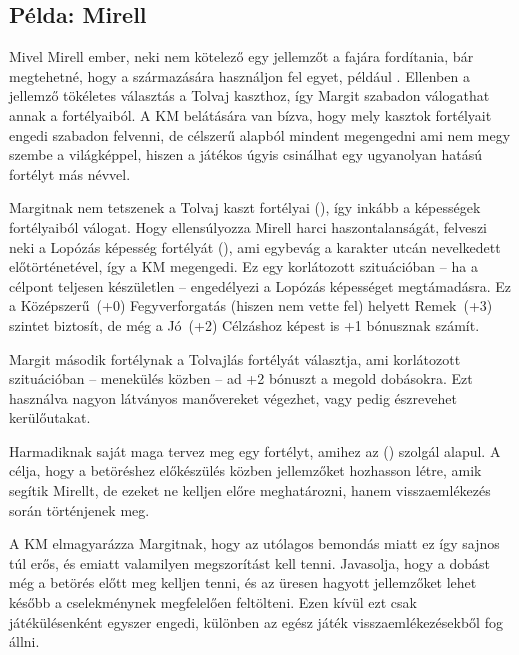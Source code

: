 \subsection[Mirell]{Példa: Mirell}

Mivel Mirell ember, neki nem kötelező egy jellemzőt a fajára fordítania, bár megtehetné, hogy a származására használjon fel egyet, például . Ellenben a  jellemző tökéletes választás a Tolvaj kaszthoz, így Margit szabadon válogathat annak a fortélyaiból. A KM belátására van bízva, hogy mely kasztok fortélyait engedi szabadon felvenni, de célszerű alapból mindent megengedni ami nem megy szembe a világképpel, hiszen a játékos úgyis csinálhat egy ugyanolyan hatású fortélyt más névvel.

Margitnak nem tetszenek a Tolvaj kaszt fortélyai (), így inkább a képességek fortélyaiból válogat. Hogy ellensúlyozza Mirell harci haszontalanságát, felveszi neki a Lopózás képesség  fortélyát (), ami egybevág a karakter utcán nevelkedett előtörténetével, így a KM megengedi. Ez egy korlátozott szituációban -- ha a célpont teljesen készületlen -- engedélyezi a Lopózás képességet megtámadásra. Ez a Középszerű~(+0) Fegyverforgatás (hiszen nem vette fel) helyett Remek~(+3) szintet biztosít, de még a Jó~(+2) Célzáshoz képest is +1 bónusznak számít.

Margit második fortélynak a Tolvajlás  fortélyát választja, ami korlátozott szituációban -- menekülés közben -- ad +2 bónuszt a megold dobásokra. Ezt használva nagyon látványos manővereket végezhet, vagy pedig észrevehet kerülőutakat.

Harmadiknak saját maga tervez meg egy fortélyt, amihez az  () szolgál alapul. A célja, hogy a betöréshez előkészülés közben jellemzőket hozhasson létre, amik segítik Mirellt, de ezeket ne kelljen előre meghatározni, hanem visszaemlékezés során történjenek meg. 


A KM elmagyarázza Margitnak, hogy az utólagos bemondás miatt ez így sajnos túl erős, és emiatt valamilyen megszorítást kell tenni. Javasolja, hogy a dobást még a betörés előtt meg kelljen tenni, és az üresen hagyott jellemzőket lehet később a cselekménynek megfelelően feltölteni. Ezen kívül ezt csak játékülésenként egyszer engedi, különben az egész játék visszaemlékezésekből fog állni.

